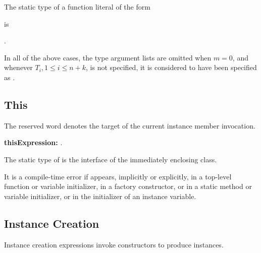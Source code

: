 \documentclass{article}
\begin{document}
\LMHash{}
The static type of a function literal of the form



\noindent
is

.

\LMHash{}
In all of the above cases,
the type argument lists are omitted when $m=0$,
and whenever $T_i, 1 \le i \le n+k$, is not specified,
it is considered to have been specified as \DYNAMIC{}.


\subsection{This}

\LMHash{}
The reserved word \THIS{} denotes the target of the current instance member invocation.

\begin{grammar}
{\bf thisExpression:}\THIS{}
  .
\end{grammar}

\LMHash{}
The static type of \THIS{} is the interface of the immediately enclosing class.


\LMHash{}
It is a compile-time error if \THIS{} appears, implicitly or explicitly, in a top-level function or variable initializer, in a factory constructor, or in a static method or variable initializer, or in the initializer of an instance variable.


\subsection{Instance Creation}

\LMHash{}
Instance creation expressions invoke constructors to produce instances.


\end{document}
